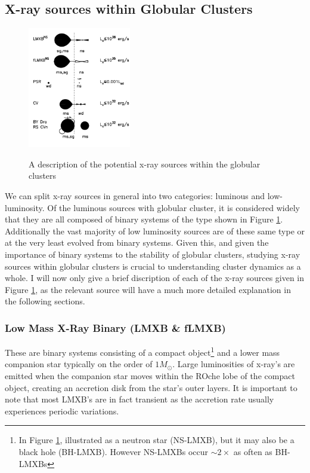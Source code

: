 \documentclass[aps,
                pra,  
                a4paper, 
                amsmath, 
                amssymb, 
                preprint,
                tightenlines,  
                amsfonts,
                nofootinbib,
            ]{revtex4-2}
\begin{document}
\subsection{X-ray sources within Globular Clusters}
\begin{figure}
    \caption{A description of the potential x-ray sources within the globular clusters\cite{Verbunt2006}}
    \includegraphics[width=0.4\textwidth]{img/gc-xray-sources.png}
    \label{fig:gc-xray-sources}
\end{figure}
We can split x-ray sources in general into two categories: luminous and low-luminosity. Of the luminous sources with globular cluster, it is considered widely that they are all composed of binary systems of the type shown in Figure \ref{fig:gc-xray-sources}. Additionally the vast majority of low luminosity sources are of these same type or at the very least evolved from binary systems. Given this, and given the importance of binary systems to the stability of globular clusters, studying x-ray sources within globular clusters is crucial to understanding cluster dynamics as a whole. I will now only give a brief discription of each of the x-ray sources given in Figure \ref{fig:gc-xray-sources}, as the relevant source will have a much more detailed explanation in the following sections.

\subsubsection{Low Mass X-Ray Binary (LMXB \& fLMXB)} 
These are binary systems consisting of a compact object\footnote{In Figure \ref{fig:gc-xray-sources}, illustrated as a neutron star (NS-LMXB), but it may also be a black hole (BH-LMXB). However NS-LMXBs occur $\sim 2\times$ as often as BH-LMXBs} and a lower mass companion star typically on the order of $1M_{\odot}$. Large luminosities of x-ray's are emitted when the companion star moves within the ROche lobe of the compact object, creating an accretion disk from the star's outer layers. It is important to note that most LMXB's are in fact transient as the accretion rate usually experiences periodic variations. 

\newpage
\nocite{*}

\end{document}
